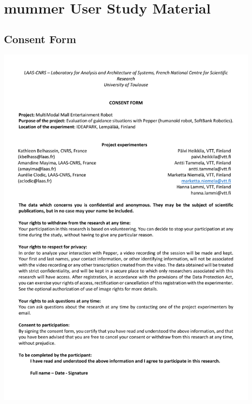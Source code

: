 \chapter{\acrshort{mummer} User Study Material}

\section{Consent Form}\label{app:consent_form}

\begin{center}
	\includegraphics[page=1, width=\textwidth]{figures/annexe1/consentform(anglais).pdf} 
\end{center}


